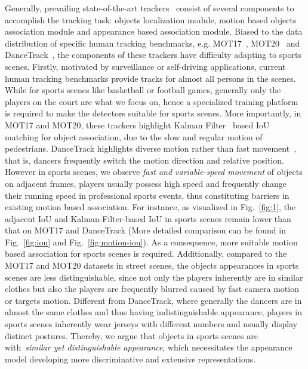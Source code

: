\documentclass[10pt,twocolumn,letterpaper]{article}
\begin{document}
Generally, prevailing state-of-the-art trackers~\cite{wojke2017simple,zhang2022bytetrack,cao2022observation,aharon2022bot,du2022strongsort} consist of several components to accomplish the tracking task: objects localization module, motion based objects association module and appearance based association module.
Biased to the data distribution of specific human tracking benchmarks, e.g. MOT17~\cite{milan2016mot16}, MOT20~\cite{dendorfer2020mot20} and DanceTrack~\cite{sun2022dancetrack}, the components of these trackers have difficulty adapting to sports scenes.
Firstly, motivated by surveillance or self-driving applications, current human tracking benchmarks provide tracks for almost all persons in the scenes. 
While for sports scenes like basketball or football games, generally only the players on the court are what we focus on, hence a specialized training platform is required to make the detectors suitable for sports scenes.
More importantly, in MOT17 and MOT20, these trackers highlight Kalman Filter~\cite{kalman1960new} based IoU matching for object association, due to the slow and regular motion of pedestrians.
DanceTrack highlights diverse motion rather than fast movement~\cite{sun2022dancetrack}, that is, dancers frequently switch the motion direction and relative position.
However in sports scenes, we observe \emph{fast and variable-speed movement} of objects on adjacent frames, \ie players usually possess high speed and frequently change their running speed in professional sports events, thus constituting barriers in existing motion based association.
For instance, as visualized in Fig.~\ref{fig:1}, the adjacent IoU and Kalman-Filter-based IoU in sports scenes remain lower than that on MOT17 and DanceTrack (More detailed comparison can be found in Fig.~\ref{fig:iou} and Fig.~\ref{fig:motion-iou}).
As a consequence, more suitable motion based association for sports scenes is required.
Additionally, compared to the MOT17 and MOT20 datasets in street scenes, the objects appearances in sports scenes are less distinguishable, since not only the players inherently are in similar clothes but also the players are frequently blurred caused by fast camera motion or targets motion.
Different from DanceTrack, where generally the dancers are in almost the same clothes and thus having indistinguishable appearance, players in sports scenes inherently wear jerseys with different numbers and usually display distinct postures.
Thereby, we argue that objects in sports scenes are with~\emph{similar yet distinguishable appearance}, which necessitates the appearance model developing more discriminative and extensive representations.
\end{document}
